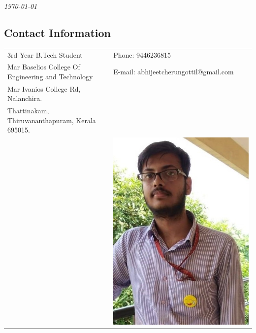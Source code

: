 \documentclass[margin,line]{res}
\begin{document}
	
	 \hfill {\em \today}
	
	\begin{resume}
		\section{\sc Contact Information}
		
		\vspace{.05in}
		\begin{tabular}{@{}p{3.5in}p{3in}}
			3rd  Year B.Tech Student                                                                     & {Phone:}  9446236815 \\
			Mar Baselios College Of Engineering
			and Technology 
			& {E-mail:}  abhijeetcherungottil@gmail.com\\
			Mar Ivanios College Rd, Nalanchira.\\
			Thattinakam, Thiruvananthapuram, Kerala 695015.\\ 
			&
			\includegraphics[width=0.15\textheight]{my}
			
		\end{tabular}
		
		\vspace{.1in}

\end{resume}
\end{document}
